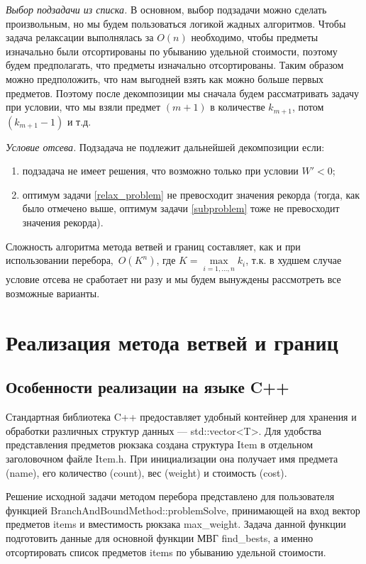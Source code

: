 \documentclass[12pt, a4paper]{article}
\begin{document}
	\textit{Выбор подзадачи из списка.} В основном, выбор подзадачи можно сделать произвольным, но мы будем пользоваться логикой жадных алгоритмов. Чтобы задача релаксации выполнялась за $O(n)$ необходимо, чтобы предметы изначально были отсортированы по убыванию удельной стоимости, поэтому будем предполагать, что предметы изначально отсортированы. Таким образом можно предположить, что нам выгодней взять как можно больше первых предметов. Поэтому после декомпозиции мы сначала будем рассматривать задачу при условии, что мы взяли предмет $(m+1)$ в количестве $k_{m+1}$, потом $(k_{m+1} - 1)$ и т.д.
	
	\textit{Условие отсева.} Подзадача не подлежит дальнейшей декомпозиции если:
	\begin{enumerate}
		\item подзадача не имеет решения, что возможно только при условии $W' < 0$;
		\item оптимум задачи \eqref{relax_problem} не превосходит значения рекорда (тогда, как было отмечено выше, оптимум задачи \eqref{subproblem} тоже не превосходит значения рекорда).
	\end{enumerate}
	
	Сложность алгоритма метода ветвей и границ составляет, как и при использовании перебора,~$O(K^n)$, где $K = \max\limits_{i=1,\dots,n} k_i$, т.к. в худшем случае условие отсева не сработает ни разу и мы будем вынуждены рассмотреть все возможные варианты.
	
	\section{Реализация метода ветвей и границ}
	
	\subsection{Особенности реализации на языке C++}
	Стандартная библиотека C++ предоставляет удобный контейнер для хранения и обработки различных структур данных --- std::vector<T>. Для удобства представления предметов рюкзака создана структура Item в отдельном заголовочном файле Item.h. При инициализации она получает имя предмета (name), его количество (count), вес (weight) и стоимость (cost). 
	
	Решение исходной задачи методом перебора представлено для пользователя функцией BranchAndBoundMethod::problemSolve, принимающей на вход вектор предметов items и вместимость рюкзака max\_weight. Задача данной функции подготовить данные для основной функции МВГ find\_bests, а именно отсортировать список предметов items по убыванию удельной стоимости.
	
\end{document}
